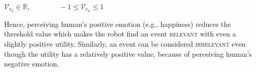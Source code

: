 \documentclass{article}
\begin{document}
\vspace*{-2mm}
\begin{center} 
    $\mathcal{V}_{e_h} \in \mathbb{R}, \qquad\qquad -1 \leq \mathcal{V}_{e_h}
    \leq 1$
\end{center}

\vspace*{-1mm}
Hence, perceiving human's positive emotion (e.g., happiness) reduces the
threshold value which makes the robot find an event \textsc{relevant} with even
a slightly positive utility. Similarly, an event can be considered
\textsc{irrelevant} even though the utility has a relatively positive value,
because of perceiving human's negative emotion.

% 
% 
% 
\end{document}
